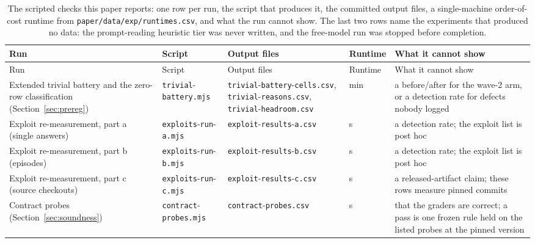 \setlength{\LTcapwidth}{\textwidth}
{\small
\begin{longtable}{@{}>{\raggedright\arraybackslash}p{}>{\raggedright\arraybackslash}p{}>{\raggedright\arraybackslash}p{}>{\raggedright\arraybackslash}p{}>{\raggedright\arraybackslash}p{}@{}}
\caption{The scripted checks this paper reports: one row per run, the script that produces it, the committed output files, a single-machine order-of-cost runtime from \texttt{paper/data/exp/runtimes.csv}, and what the run cannot show. The last two rows name the experiments that produced no data: the prompt-reading heuristic tier was never written, and the free-model run was stopped before completion.\label{tab:experiments}}\\
\toprule
Run & Script & Output files & Runtime & What it cannot show \\
\midrule
\endfirsthead
\toprule
Run & Script & Output files & Runtime & What it cannot show \\
\midrule
\endhead
Extended trivial battery and the zero-row classification (Section~\ref{sec:prereg}) & \texttt{trivial}-\allowbreak\texttt{battery.mjs} & \texttt{trivial}-\allowbreak\texttt{battery}-\allowbreak\texttt{cells.csv}, \texttt{trivial}-\allowbreak\texttt{reasons.csv}, \texttt{trivial}-\allowbreak\texttt{headroom.csv} & \expRuntimeBatteryMin{} min & a before/after for the wave-2 arm, or a detection rate for defects nobody logged \\
\addlinespace
Exploit re-measurement, part a (single answers) & \texttt{exploits}-\allowbreak\texttt{run}-\allowbreak\texttt{a.mjs} & \texttt{exploit}-\allowbreak\texttt{results}-\allowbreak\texttt{a.csv} & \expRuntimeExplASec{} s & a detection rate; the exploit list is post hoc \\
Exploit re-measurement, part b (episodes) & \texttt{exploits}-\allowbreak\texttt{run}-\allowbreak\texttt{b.mjs} & \texttt{exploit}-\allowbreak\texttt{results}-\allowbreak\texttt{b.csv} & \expRuntimeExplBSec{} s & a detection rate; the exploit list is post hoc \\
Exploit re-measurement, part c (source checkouts) & \texttt{exploits}-\allowbreak\texttt{run}-\allowbreak\texttt{c.mjs} & \texttt{exploit}-\allowbreak\texttt{results}-\allowbreak\texttt{c.csv} & \expRuntimeExplCSec{} s & a released-artifact claim; these rows measure pinned commits \\
\addlinespace
Contract probes (Section~\ref{sec:soundness}) & \texttt{contract}-\allowbreak\texttt{probes.mjs} & \texttt{contract}-\allowbreak\texttt{probes.csv} & \expRuntimeProbesSec{} s & that the graders are correct; a pass is one frozen rule held on the listed probes at the pinned version \\

\end{longtable}}
